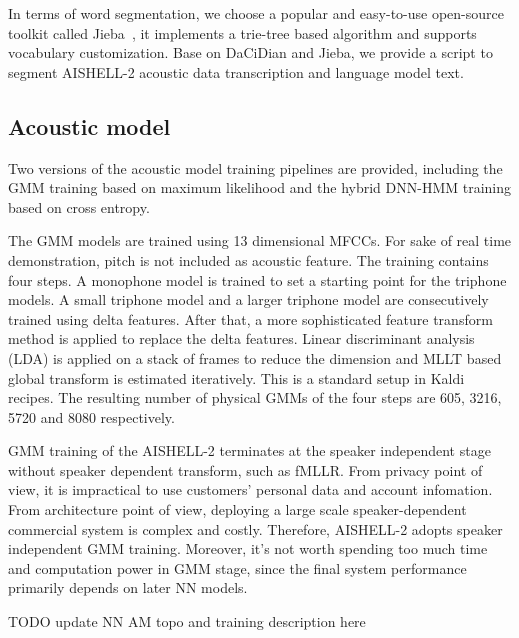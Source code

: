 \documentclass[a4paper]{article}
\begin{document}
In terms of word segmentation, we choose a popular and easy-to-use open-source
toolkit called Jieba~\cite{jieba}, it implements a trie-tree based algorithm and
supports vocabulary customization.  Base on DaCiDian and Jieba, we provide a
script to segment AISHELL-2 acoustic data transcription and language model text.

\subsection{Acoustic model}

Two versions of the acoustic model training pipelines are provided, including
the GMM training based on maximum likelihood and the hybrid DNN-HMM training
based on cross entropy.

The GMM models are trained using 13 dimensional MFCCs. For sake of real time
demonstration, pitch is not included as acoustic feature. The training contains
four steps. A monophone model is trained to set a starting point for the
triphone models. A small triphone model and a larger triphone model are
consecutively trained using delta features. After that, a more sophisticated
feature transform method is applied to replace the delta features. Linear
discriminant analysis (LDA) is applied on a stack of frames to reduce the
dimension and MLLT based global transform is estimated iteratively. This is a
standard setup in Kaldi recipes. The resulting number of physical GMMs of the
four steps are 605, 3216, 5720 and 8080 respectively.

GMM training of the AISHELL-2 terminates at the speaker independent stage
without speaker dependent transform, such as fMLLR. From privacy point of view,
it is impractical to use customers' personal data and account
infomation. From architecture point of view, deploying a large scale
speaker-dependent commercial system is complex and costly. Therefore, AISHELL-2
adopts speaker independent GMM training. Moreover, it's not worth 
spending too much time and computation power in GMM stage, since the final system 
performance primarily depends on later NN models.

TODO update NN AM topo and training description here

\end{document}
